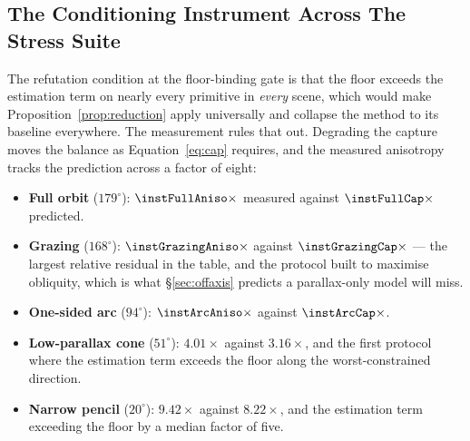 
\subsection*{The Conditioning Instrument Across The Stress Suite}

The refutation condition at the floor-binding gate is that the floor exceeds the estimation
term on nearly every primitive in \emph{every} scene, which would make Proposition~\ref{prop:reduction} apply universally and collapse
the method to its baseline everywhere. The measurement rules that out. Degrading
the capture moves the balance as Equation~\eqref{eq:cap} requires, and the measured anisotropy tracks the
prediction across a factor of eight:

\begin{itemize}[leftmargin=1.4em,itemsep=2pt]
  \item \textbf{Full orbit} ($179^\circ$): $\instFullAniso\times$ measured
        against $\instFullCap\times$ predicted.
  \item \textbf{Grazing} ($168^\circ$): $\instGrazingAniso\times$ against
        $\instGrazingCap\times$ --- the largest relative residual in the table,
        and the protocol built to maximise obliquity, which is what
        \S\ref{sec:offaxis} predicts a parallax-only model will miss.
  \item \textbf{One-sided arc} ($94^\circ$): $\instArcAniso\times$ against
        $\instArcCap\times$.
  \item \textbf{Low-parallax cone} ($51^\circ$): $4.01\times$ against
        $3.16\times$, and the first protocol where the estimation term exceeds
        the floor along the worst-constrained direction.
  \item \textbf{Narrow pencil} ($20^\circ$): $9.42\times$ against $8.22\times$,
        and the estimation term exceeding the floor by a median factor of five.
\end{itemize}

